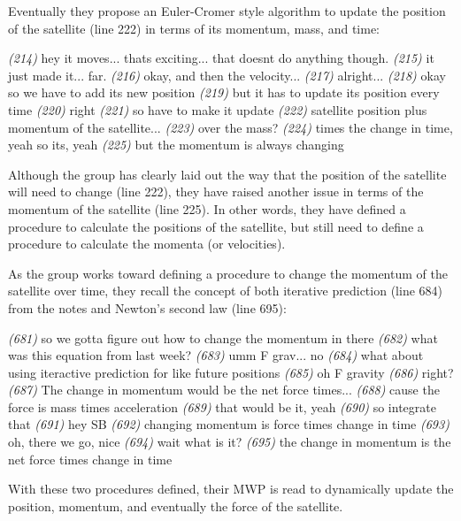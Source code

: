 \documentclass{msuphddissertation}
\begin{document}
\begin{doublespace}
Eventually they propose an Euler-Cromer style algorithm to update the position of the satellite (line 222) in terms of its momentum, mass, and time:
\begin{description}
\SB \textit{(214)} hey it moves... thats exciting... that doesnt do anything though.
\SA \textit{(215)} it just made it... far.
\SA \textit{(216)} okay, and then the velocity...
\SB \textit{(217)} alright...	
\SB \textit{(218)} okay so we have to add its {new} position		
\SA \textit{(219)} but it has to update its position every time
\SB \textit{(220)} right		
\SA \textit{(221)} so have to make it update			
\SB \textit{(222)} satellite position plus momentum of the satellite...
\SA \textit{(223)} over the mass?			
\SB \textit{(224)} times the change in time, yeah so its, yeah		
\SB \textit{(225)} but the momentum is always changing
\end{description}  Although the group has clearly laid out the way that the position of the satellite will need to change (line 222), they have raised another issue in terms of the momentum of the satellite (line 225).  In other words, they have defined a procedure to calculate the positions of the satellite, but still need to define a procedure to calculate the momenta (or velocities).

As the group works toward defining a procedure to change the momentum of the satellite over time, they recall the concept of both iterative prediction (line 684) from the notes and Newton's second law (line 695):
\begin{description}
\SB \textit{(681)} so we gotta figure out how to change the momentum in there		
\SB \textit{(682)} what was this equation from last week?		
\SA \textit{(683)} umm F grav... no			
\SD \textit{(684)} what about using iteractive prediction for like future positions
\SA \textit{(685)} oh F gravity			
\SD \textit{(686)} right?
\SC \textit{(687)} The change in momentum would be the net force times...	
\SB \textit{(688)} cause the force is mass times acceleration		
\SC \textit{(689)} that would be it, yeah	
\SB \textit{(690)} so integrate that		
\SC \textit{(691)} hey SB
\SC \textit{(692)} changing momentum is force times change in time	
\SB \textit{(693)} oh, there we go, nice
\SA \textit{(694)} wait what is it?
\SB \textit{(695)} the change in momentum is the net force times change in time
\end{description}  With these two procedures defined, their MWP is read to dynamically update the position, momentum, and eventually the force of the satellite.


\end{doublespace}
\end{document}
